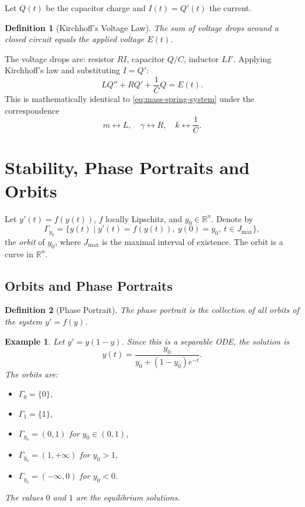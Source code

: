 \documentclass{article}
\newtheorem{definition}{Definition}
\newtheorem*{example}{Example}
\newcommand{\R}{\mathbb{R}}
\begin{document}
Let $Q(t)$ be the capacitor charge and $I(t) = Q'(t)$ the current.

\begin{definition}[Kirchhoff's Voltage Law]
    The sum of voltage drops around a closed circuit equals the 
    applied voltage $E(t)$.
\end{definition}

The voltage drops are: resistor $RI$, capacitor $Q/C$, inductor 
$LI'$. Applying Kirchhoff's law and substituting $I = Q'$:
\begin{equation}
    \label{eq:RLC-circuit}
    LQ'' + RQ' + \frac{1}{C}Q = E(t).
\end{equation}
This is mathematically identical to \eqref{eq:mass-spring-system} 
under the correspondence
\[m \leftrightarrow L, \quad \gamma \leftrightarrow R, \quad 
k \leftrightarrow \frac{1}{C}.\]

\section{Stability, Phase Portraits and Orbits}

Let $y'(t) = f(y(t))$, $f$ locally Lipschitz, and $y_0 \in \R^n$. Denote by
\[
\Gamma_{y_0} = \{y(t) \mid y'(t) = f(y(t)),\ y(0) = y_0,\ t \in J_{\max}\},
\]
the \emph{orbit} of $y_0$, where $J_{\max}$ is the maximal interval of existence. The orbit is a curve in $\R^n$.

\subsection{Orbits and Phase Portraits}

\begin{definition}[Phase Portrait]
    The phase portrait is the collection of all orbits of the system $y' = f(y)$.
\end{definition}

\begin{example}
    Let $y' = y(1-y)$. Since this is a separable ODE, the solution is
    \[y(t) = \frac{y_0}{y_0 + (1-y_0)e^{-t}}.\]
    The orbits are:
    \begin{itemize}
        \item $\Gamma_0 = \{0\}$,
        \item $\Gamma_1 = \{1\}$,
        \item $\Gamma_{y_0} = (0,1)$ for $y_0 \in (0,1)$,
        \item $\Gamma_{y_0} = (1,+\infty)$ for $y_0 > 1$,
        \item $\Gamma_{y_0} = (-\infty,0)$ for $y_0 < 0$.
    \end{itemize}
    The values $0$ and $1$ are the equilibrium solutions.
\end{example}
\end{document}
